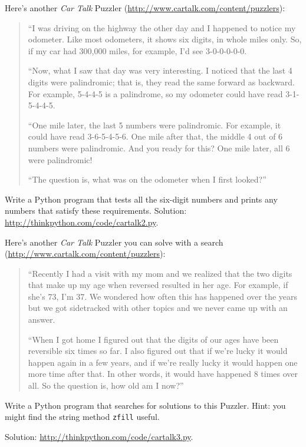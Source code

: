 \documentclass[10pt]{book}
\begin{document}
\begin{exercise}
Here's another {\em Car Talk}
Puzzler (\url{http://www.cartalk.com/content/puzzlers}):

\begin{quote}
``I was driving on the highway the other day and I happened to
notice my odometer. Like most odometers, it shows six digits,
in whole miles only. So, if my car had 300,000
miles, for example, I'd see 3-0-0-0-0-0.

``Now, what I saw that day was very interesting. I noticed that the
last 4 digits were palindromic; that is, they read the same forward as
backward. For example, 5-4-4-5 is a palindrome, so my odometer
could have read 3-1-5-4-4-5.

``One mile later, the last 5 numbers were palindromic. For example, it
could have read 3-6-5-4-5-6.  One mile after that, the middle 4 out of
6 numbers were palindromic.  And you ready for this? One mile later,
all 6 were palindromic!

``The question is, what was on the odometer when I first looked?''
\end{quote}

Write a Python program that tests all the six-digit numbers and prints
any numbers that satisfy these requirements.
Solution: \url{http://thinkpython.com/code/cartalk2.py}.

\end{exercise}


\begin{exercise}
Here's another {\em Car Talk} Puzzler you can solve with a
search (\url{http://www.cartalk.com/content/puzzlers}):

\begin{quote}
``Recently I had a visit with my mom and we realized that
the two digits that make up my age when reversed resulted in her
age. For example, if she's 73, I'm 37. We wondered how often this has
happened over the years but we got sidetracked with other topics and
we never came up with an answer.

``When I got home I figured out that the digits of our ages have been
reversible six times so far. I also figured out that if we're lucky it
would happen again in a few years, and if we're really lucky it would
happen one more time after that. In other words, it would have
happened 8 times over all. So the question is, how old am I now?''

\end{quote}

Write a Python program that searches for solutions to this Puzzler.
Hint: you might find the string method {\tt zfill} useful.

Solution: \url{http://thinkpython.com/code/cartalk3.py}.

\end{exercise}
\end{document}
